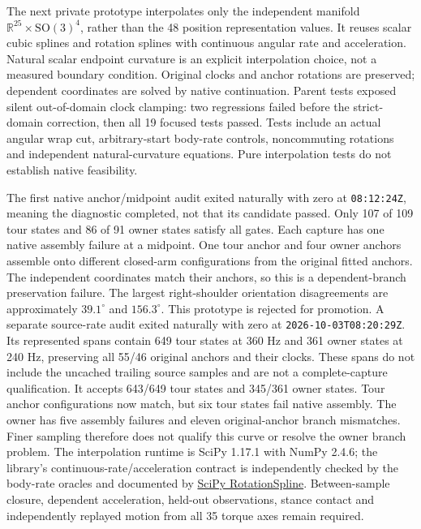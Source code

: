 \documentclass[11pt,a4paper]{article}
\begin{document}
The next private prototype interpolates only the independent manifold
$\mathbb R^{25}\times\mathrm{SO}(3)^4$, rather than the 48 position
representation values. It reuses scalar cubic splines and rotation splines
with continuous angular rate and acceleration. Natural scalar endpoint
curvature is an explicit interpolation choice, not a measured boundary
condition. Original clocks and anchor rotations are preserved; dependent
coordinates are solved by native continuation. Parent tests exposed silent
out-of-domain clock clamping: two regressions failed before the strict-domain
correction, then all 19 focused tests passed. Tests include an actual angular
wrap cut, arbitrary-start body-rate controls, noncommuting rotations and
independent natural-curvature equations. Pure interpolation tests do not
establish native feasibility.

The first native anchor/midpoint audit exited naturally with zero at
\texttt{08:12:24Z}, meaning the diagnostic completed, not that its candidate
passed. Only 107 of 109 tour states and 86 of 91 owner states satisfy all
gates. Each capture has one native assembly failure at a midpoint. One tour
anchor and four owner anchors assemble onto different closed-arm configurations
from the original fitted anchors. The independent coordinates match their
anchors, so this is a dependent-branch preservation failure. The largest
right-shoulder orientation disagreements are approximately $39.1^{\circ}$
and $156.3^{\circ}$. This prototype is rejected for promotion. A separate source-rate audit exited naturally with zero at
\texttt{2026-10-03T08:20:29Z}. Its represented spans contain 649 tour states
at 360 Hz and 361 owner states at 240 Hz, preserving all 55/46 original
anchors and their clocks. These spans do not include the uncached trailing
source samples and are not a complete-capture qualification. It accepts
643/649 tour states and 345/361 owner states. Tour anchor configurations now
match, but six tour states fail native assembly. The owner has five assembly
failures and eleven original-anchor branch mismatches. Finer sampling
therefore does not qualify this curve or resolve the owner branch problem.
The interpolation runtime is SciPy 1.17.1 with NumPy 2.4.6; the library's
continuous-rate/acceleration contract is independently checked by the body-rate
oracles and documented by
\href{https://docs.scipy.org/doc/scipy/reference/generated/scipy.spatial.transform.RotationSpline.html}{SciPy RotationSpline}. Between-sample closure,
dependent acceleration, held-out observations, stance contact and independently
replayed motion from all 35 torque axes remain required.
\end{document}
